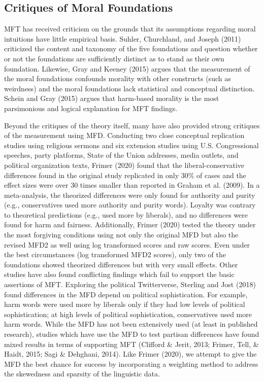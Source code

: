 \documentclass[
  man,floatsintext]{apa6}
\begin{document}
\subsection{Critiques of Moral Foundations}\label{critiques-of-moral-foundations}

MFT has received criticism on the grounds that its assumptions regarding
moral intuitions have little empirical basis. Suhler, Churchland, and Joseph (2011) criticized the
content and taxonomy of the five foundations and question whether or not
the foundations are sufficiently distinct as to stand as their own
foundation. Likewise, Gray and Keeney (2015) argues that the measurement of the moral
foundations confounds morality with other constructs (such as weirdness)
and the moral foundations lack statistical and conceptual distinction.
Schein and Gray (2015) argues that harm-based morality is the most parsimonious and
logical explanation for MFT findings.

Beyond the critiques of the theory itself, many have also provided
strong critiques of the measurement using MFD. Conducting two close
conceptual replication studies using religious sermons and six extension
studies using U.S. Congressional speeches, party platforms, State of the
Union addresses, media outlets, and political organization texts,
Frimer (2020) found that the liberal-conservative differences found in the
original study replicated in only 30\% of cases and the effect sizes were
over 30 times smaller than reported in Graham et al. (2009). In a meta-analysis,
the theorized differences were only found for authority and purity
(e.g., conservatives used more authority and purity words). Loyalty was
contrary to theoretical predictions (e.g., used more by liberals), and
no differences were found for harm and fairness. Additionally,
Frimer (2020) tested the theory under the most forgiving conditions using
not only the original MFD but also the revised MFD2 as well using log
transformed scores and raw scores. Even under the best circumstances
(log transformed MFD2 scores), only two of the foundations showed
theorized differences but with very small effects. Other studies have
also found conflicting findings which fail to support the basic
assertions of MFT. Exploring the political Twitterverse, Sterling and Jost (2018)
found differences in the MFD depend on political sophistication. For
example, harm words were used more by liberals only if they had low
levels of political sophistication; at high levels of political
sophistication, conservatives used more harm words. While the MFD has
not been extensively used (at least in published research), studies
which have use the MFD to test partisan differences have found mixed
results in terms of supporting MFT (Clifford \& Jerit, 2013; Frimer, Tell, \& Haidt, 2015; Sagi \& Dehghani, 2014). Like Frimer (2020), we attempt to give the MFD the best chance
for success by incorporating a weighting method to address the
skewedness and sparsity of the linguistic data.
\end{document}
